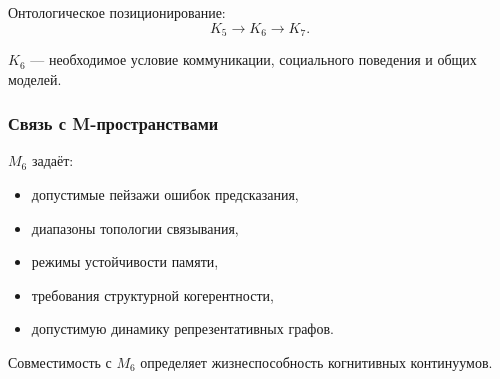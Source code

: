 Онтологическое позиционирование:
\[
K_5 \to K_6 \to K_7.
\]

$K_6$ — необходимое условие коммуникации, социального поведения и
общих моделей.

\subsubsection{Связь с M-пространствами}

$M_6$ задаёт:
\begin{itemize}
    \item допустимые пейзажи ошибок предсказания,
    \item диапазоны топологии связывания,
    \item режимы устойчивости памяти,
    \item требования структурной когерентности,
    \item допустимую динамику репрезентативных графов.
\end{itemize}

Совместимость с $M_6$ определяет жизнеспособность когнитивных континуумов.
